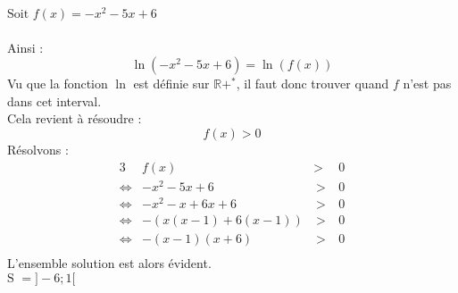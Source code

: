 \documentclass[a4paper,fleqn]{article}
\date{\today}
\begin{document}
	$\text{Soit } f(x) = -x^2-5x+6$ \\ \\
	Ainsi :
	\[
		\ln(-x^2-5x+6)=\ln(f(x))
	\]
	Vu que la fonction $\ln$ est définie sur $\mathbb{R}+^*$, il faut donc trouver quand $f$ n'est pas dans cet interval. \\
	Cela revient à résoudre :
	\[
		f(x)>0
	\]
	Résolvons :
	\begin{alignat*}{3}
		~ & f(x) & > & 0 \\
		\Leftrightarrow  & -x^2-5x+6        & ~>~ & 0 \\
		\Leftrightarrow  & -x^2-x+6x+6      & ~>~ & 0 \\
		\Leftrightarrow  & -(x(x-1)+6(x-1)) & ~>~ & 0 \\
		\Leftrightarrow  & -(x-1)(x+6)      & ~>~ & 0 \\
	\end{alignat*}
	L'ensemble solution est alors évident. \\
	$\text{S } = ]-6;1[$
\end{document}
